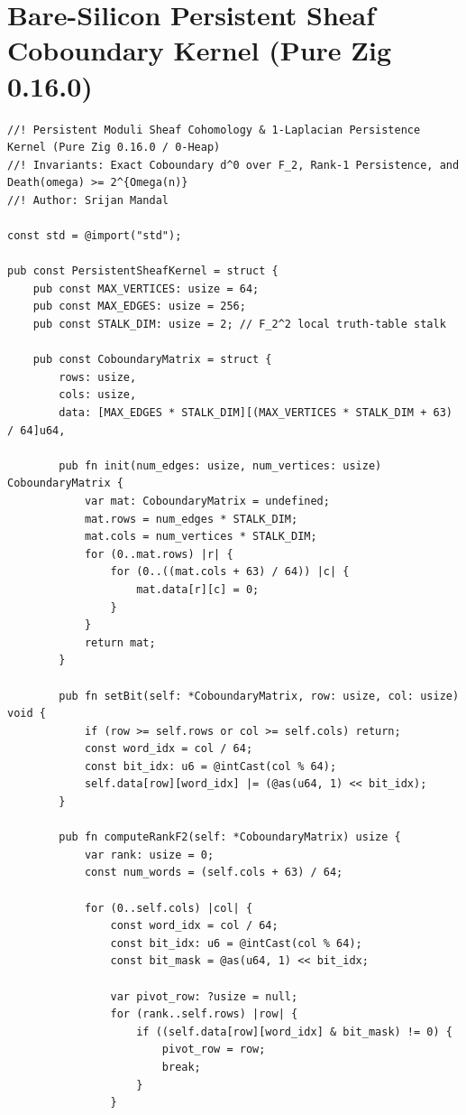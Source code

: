 \documentclass[11pt,a4paper]{article}
\theoremstyle{definition}
\theoremstyle{remark}
\begin{document}
\section{Bare-Silicon Persistent Sheaf Coboundary Kernel (Pure Zig 0.16.0)}\label{app:sheaf_kernel}

\begin{lstlisting}
//! Persistent Moduli Sheaf Cohomology & 1-Laplacian Persistence Kernel (Pure Zig 0.16.0 / 0-Heap)
//! Invariants: Exact Coboundary d^0 over F_2, Rank-1 Persistence, and Death(omega) >= 2^{Omega(n)}
//! Author: Srijan Mandal

const std = @import("std");

pub const PersistentSheafKernel = struct {
    pub const MAX_VERTICES: usize = 64;
    pub const MAX_EDGES: usize = 256;
    pub const STALK_DIM: usize = 2; // F_2^2 local truth-table stalk

    pub const CoboundaryMatrix = struct {
        rows: usize,
        cols: usize,
        data: [MAX_EDGES * STALK_DIM][(MAX_VERTICES * STALK_DIM + 63) / 64]u64,

        pub fn init(num_edges: usize, num_vertices: usize) CoboundaryMatrix {
            var mat: CoboundaryMatrix = undefined;
            mat.rows = num_edges * STALK_DIM;
            mat.cols = num_vertices * STALK_DIM;
            for (0..mat.rows) |r| {
                for (0..((mat.cols + 63) / 64)) |c| {
                    mat.data[r][c] = 0;
                }
            }
            return mat;
        }

        pub fn setBit(self: *CoboundaryMatrix, row: usize, col: usize) void {
            if (row >= self.rows or col >= self.cols) return;
            const word_idx = col / 64;
            const bit_idx: u6 = @intCast(col % 64);
            self.data[row][word_idx] |= (@as(u64, 1) << bit_idx);
        }

        pub fn computeRankF2(self: *CoboundaryMatrix) usize {
            var rank: usize = 0;
            const num_words = (self.cols + 63) / 64;

            for (0..self.cols) |col| {
                const word_idx = col / 64;
                const bit_idx: u6 = @intCast(col % 64);
                const bit_mask = @as(u64, 1) << bit_idx;

                var pivot_row: ?usize = null;
                for (rank..self.rows) |row| {
                    if ((self.data[row][word_idx] & bit_mask) != 0) {
                        pivot_row = row;
                        break;
                    }
                }


\end{lstlisting}
\end{document}
